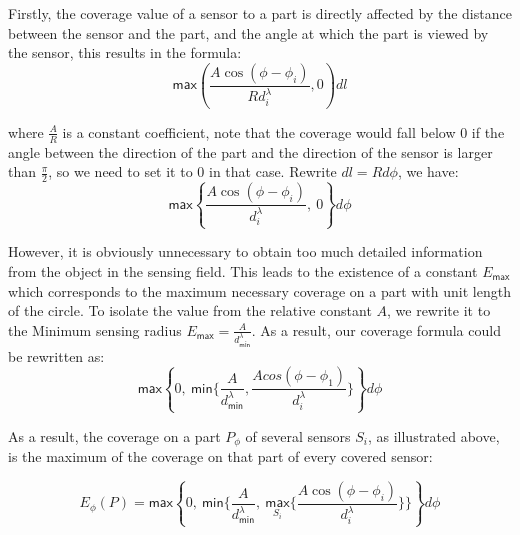 Firstly, the coverage value of a sensor to a part is directly affected by the distance between the sensor and the part, and the angle at which the part is viewed by the sensor, this results in the formula:
\begin{equation}
\label{eq1}
\mathsf{max}(\frac{A\cos(\phi - \phi_i)}{Rd_i^\lambda}, 0)dl
\end{equation}


where $\frac{A}{R}$ is a constant coefficient, note that the coverage would fall below 0 if the angle between the direction of the part and the direction of the sensor is larger than $\frac{\pi}{2}$, so we need to set it to 0 in that case. Rewrite $dl = Rd\phi$, we have:
\begin{equation}
\label{eq2}
\mathsf{max}\left\{\frac{A\cos(\phi - \phi_i)}{d_i^\lambda},\ 0\right\}d\phi
\end{equation}

However, it is obviously unnecessary to obtain too much detailed information from the object in the sensing field. This leads to the existence of a constant $E_{\mathsf{max}}$ which corresponds to the maximum necessary coverage on a part with unit length of the circle. To isolate the value from the relative constant $A$, we rewrite it to the Minimum sensing radius $E_{\mathsf{max}} = \frac{A}{d_{\mathsf{min}}^\lambda}$. As a result, our coverage formula could be rewritten as:
\begin{equation}
\label{eq3}
\mathsf{max}\left\{0,\ \mathsf{min}\Big\{\frac{A}{d_{\mathsf{min}}^\lambda}, \frac{Acos(\phi - \phi_1)}{d_i^\lambda}\Big\}\right\}d\phi
\end{equation}

As a result, the coverage on a part $P_\phi$ of several sensors $S_i$, as illustrated above, is the maximum of the coverage on that part of every covered sensor:

\begin{equation}
\label{eq4}
E_\phi(P) = \mathsf{max}\left\{0,\ \mathsf{min}\Big\{\frac{A}{d_{\mathsf{min}}^\lambda},\ \underset{S_i}{\mathsf{max}}\big\{\frac{A\cos(\phi - \phi_i)}{d_i^\lambda}\big\}\Big\}\right\}d\phi
\end{equation}


